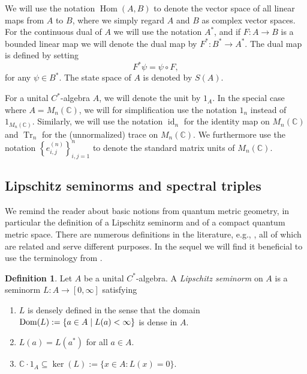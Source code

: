 \documentclass[11pt, a4paper, oneside, final, reqno]{amsart}
\newcommand{\bbC}{\mathbb{C}}
\newcommand{\Hom}{\operatorname{Hom}}
\newcommand{\id}{\operatorname{id}}
\newcommand{\Tr}{\operatorname{Tr}}
\theoremstyle{definition}
\newtheorem{definition}{Definition}[section]
\theoremstyle{plain}
\theoremstyle{remark}
\numberwithin{equation}{section}
\begin{document}
We will use the notation $\Hom(A,B)$ to denote the vector space of all linear maps from $A$ to $B$, where we simply regard $A$ and $B$ as complex vector spaces. For the continuous dual of $A$ we will use the notation $A^*$, and if $F \colon A \to B$ is a bounded linear map we will denote the dual map by $F^* \colon B^* \to A^*$. The dual map is defined by setting
\begin{equation*}
    F^*\psi = \psi \circ F,
\end{equation*}
for any $\psi \in B^*$. The state space of $A$ is denoted by $S(A)$.

For a unital $C^*$-algebra $A$, we will denote the unit by $1_A$. In the special case where $A = M_n(\bbC)$, we will for simplification use the notation $1_n$ instead of $1_{M_n(\bbC)}$. Similarly, we will use the notation $\id_n$ for the identity map on $M_n(\bbC)$ and $\Tr_n$ for the (unnormalized) trace on $M_n(\bbC)$. We furthermore use the notation $\left\{e_{i,j}^{(n)}\right\}_{i,j=1}^{n}$ to denote the standard matrix units of $M_n(\bbC)$.

\subsection{Lipschitz seminorms and spectral triples}\label{sec:lipschitz-seminorms-and-cqms}

We remind the reader about basic notions from quantum metric geometry, in particular the definition of a Lipschitz seminorm and of a compact quantum metric space. There are numerous definitions in the literature, e.g., \cite{Rieffel2004, RieffelGHdistanceforQMS, RieffelMatricialBridges, Kaad24}, all of which are related and serve different purposes. In the sequel we will find it beneficial to use the terminology from \cite{KaadKyed2025}.

\begin{definition}\label{def:Lipschitz-seminorm}
    Let $A$ be 
    a unital  $C^*$-algebra. A \emph{Lipschitz seminorm} on $A$ is a seminorm $L \colon A \to [0,\infty]$ satisfying
    \begin{enumerate}
        \item $L$ is densely defined in the sense that the domain ${\rm Dom}(L) := \{a \in A \mid L(a) < \infty \}$ is dense in $A$.
        \item $L(a) = L(a^*)$ for all $a \in A$.
        \item $\bbC \cdot 1_A \subseteq \ker(L) := \{ x \in A : L(x) = 0 \}$.
    \end{enumerate}
\end{definition}
\end{document}
